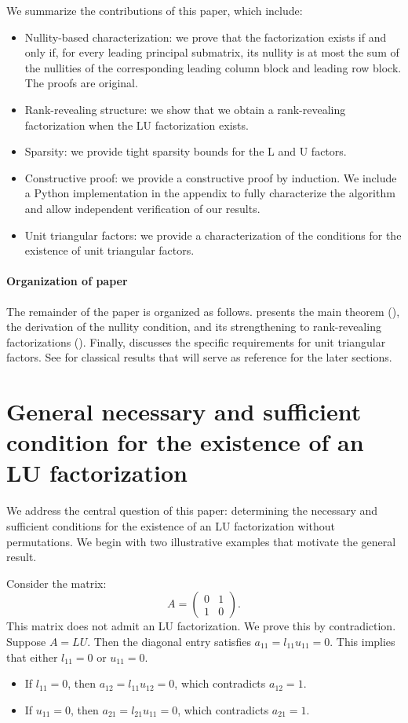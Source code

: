 \documentclass[10pt,twoside]{siamart1116}
\numberwithin{theorem}{section}
\begin{document}
We summarize the contributions of this paper, which include:
\begin{itemize}
  \item Nullity-based characterization: we prove that the factorization exists if and only if, for every leading principal submatrix, its nullity is at most the sum of the nullities of the corresponding leading column block and leading row block. The proofs are original.
  \item Rank-revealing structure: we show that we obtain a rank-revealing factorization when the LU factorization exists.
  \item Sparsity: we provide tight sparsity bounds for the L and U factors.
  \item Constructive proof: we provide a constructive proof by induction. We include a Python implementation in the appendix to fully characterize the algorithm and allow independent verification of our results.
  \item Unit triangular factors: we provide a characterization of the conditions for the existence of unit triangular factors.
\end{itemize}

\paragraph{Organization of paper}
The remainder of the paper is organized as follows.  presents the main theorem (), the derivation of the nullity condition, and its strengthening to rank-revealing factorizations (). Finally,  discusses the specific requirements for unit triangular factors. See  for classical results that will serve as reference for the later sections.

\section{General necessary and sufficient condition for the existence of an LU factorization}\label{sec:main}

We address the central question of this paper: determining the necessary and sufficient conditions for the existence of an LU factorization without permutations. We begin with two illustrative examples that motivate the general result.

Consider the matrix:
\[
  A =
  \begin{pmatrix} 0 & 1 \\ 1 & 0
  \end{pmatrix} .
\]
This matrix does not admit an LU factorization. We prove this by contradiction. Suppose $A = LU$. Then the diagonal entry satisfies $a_{11} = l_{11} u_{11} = 0$. This implies that either $l_{11} = 0$ or $u_{11} = 0$.
\begin{itemize}
  \item If $l_{11} = 0$, then $a_{12} = l_{11} u_{12} = 0$, which contradicts $a_{12} = 1$.
  \item If $u_{11} = 0$, then $a_{21} = l_{21} u_{11} = 0$, which contradicts $a_{21} = 1$.
\end{itemize}
\end{document}
